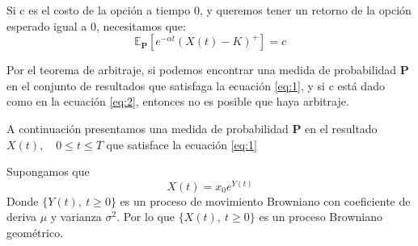 \documentclass{beamer}
\begin{document}
\begin{frame}
Si c es el costo de la opción a tiempo 0, y queremos tener un retorno de la opción esperado igual a 0, necesitamos que:
\begin{equation} \label{eq:2}
\mathbb{E}_{\textbf{P}}[e^{-\alpha t}\left( X(t) - K \right)^{+}] = c
\end{equation}
\end{frame}

\begin{frame}
	Por el teorema de arbitraje, si podemos encontrar una medida de probabilidad $\textbf{P}$ en el conjunto de resultados que satisfaga la ecuación \ref{eq:1}, y si c está dado como en la ecuación \ref{eq:2}, entonces no es posible que haya arbitraje.
\end{frame}

\begin{frame}
A continuación presentamos una medida de probabilidad $\textbf{P}$ en el resultado $X(t),\quad 0 \leq t \leq T$ que satisface la ecuación \ref{eq:1}\par
Supongamos que
\begin{equation*}
	X(t) = x_{0}e^{Y(t)}
\end{equation*}
Donde $\{Y(t),\ t\geq 0\}$ es un proceso de movimiento Browniano con coeficiente de deriva $\mu$ y varianza $\sigma^2$. Por lo que $\{X(t),\ t\geq 0\}$ es un proceso Browniano geométrico.
\end{frame}
\end{document}

